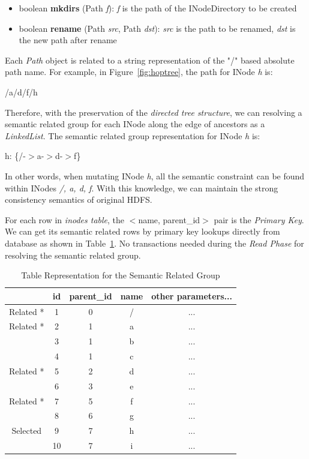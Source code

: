\begin{itemize}[noitemsep]
	\item boolean \textbf{mkdirs} (Path \textit{f}): \textit{f} is the path of the INodeDirectory to be created
	\item boolean \textbf{rename} (Path \textit{src}, Path \textit{dst}): \textit{src} is the path to be renamed, \textit{dst} is the new path after rename
\end{itemize} 

\noindent Each \textit{Path} object is related to a string representation of the "/" based absolute path name. For example, in Figure~\ref{fig:hoptree}, the path for INode \textit{h} is: 
\begin{center}
	/a/d/f/h
\end{center}

\noindent Therefore, with the preservation of the \textit{directed tree structure}, we can resolving a semantic related group for each INode along the edge of ancestors as a \textit{LinkedList}. The semantic related group representation for INode \textit{h} is:
\begin{center}
	h: \{/-$>$a-$>$d-$>$f\}
\end{center}

\noindent In other words, when mutating INode \textit{h}, all the semantic constraint can be found within INodes \textit{/, a, d, f}. With this knowledge, we can maintain the strong consistency semantics of original HDFS.

\noindent For each row in \textit{inodes table}, the $<$name, parent\_id$>$ pair is the \textit{Primary Key}. We can get its semantic related rows by primary key lookups directly from database as shown in Table~\ref{table:semanticrelatedTable}. No transactions needed during the \textit{Read Phase} for resolving the semantic related group.

\begin{table}[h]
	\centering
	\begin{tabular}{|c|c|c|c|c|}
		\hline
		~ & \textbf{id} & \textbf{parent\_id} & \textbf{name} & \textbf{other parameters...} \\ \hline
		Related * & 1 & 0 & / & ... \\ \hline
		Related * & 2 & 1 & a & ... \\ \hline
		~ & 3 & 1 & b & ... \\ \hline
		~ & 4 & 1 & c & ... \\ \hline
		Related * & 5 & 2 & d & ... \\ \hline
		~ & 6 & 3 & e & ... \\ \hline
		Related * & 7 & 5 & f & ... \\ \hline
		~ & 8 & 6 & g & ... \\ \hline
		Selected \checkmark & 9 & 7 & h & ... \\ \hline
		~ & 10 & 7 & i & ... \\ \hline
	\end{tabular}
	\caption{Table Representation for the Semantic Related Group}
	\label{table:semanticrelatedTable}
\end{table}

